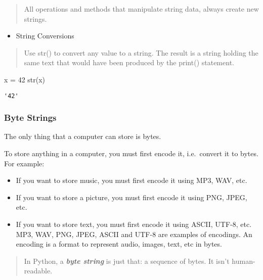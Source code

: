 \documentclass[
  letterpaper,
  DIV=11,
  numbers=noendperiod]{scrreprt}
\newenvironment{Shaded}{\begin{snugshade}}{\end{snugshade}}
\newcommand{\BuiltInTok}[1]{\textcolor[rgb]{0.00,0.46,0.62}{#1}}
\newcommand{\DecValTok}[1]{\textcolor[rgb]{0.68,0.00,0.00}{#1}}
\newcommand{\NormalTok}[1]{\textcolor[rgb]{0.00,0.46,0.62}{#1}}
\newcommand{\OperatorTok}[1]{\textcolor[rgb]{0.37,0.37,0.37}{#1}}
\providecommand{\tightlist}{%
  \setlength{\itemsep}{0pt}\setlength{\parskip}{0pt}}
\begin{document}
\begin{quote}
All operations and methods that manipulate string data, always create
new strings.
\end{quote}

\begin{itemize}
\tightlist
\item
  String Conversions
\end{itemize}

\begin{quote}
Use str() to convert any value to a string. The result is a string
holding the same text that would have been produced by the print()
statement.
\end{quote}

\begin{Shaded}
\begin{Highlighting}[]
\NormalTok{x }\OperatorTok{=} \DecValTok{42}
\BuiltInTok{str}\NormalTok{(x)}
\end{Highlighting}
\end{Shaded}

\begin{verbatim}
'42'
\end{verbatim}

\hypertarget{byte-strings}{%
\subsubsection{Byte Strings}\label{byte-strings}}

The only thing that a computer can store is bytes.

To store anything in a computer, you must first encode it, i.e.~convert
it to bytes. For example:

\begin{itemize}
\item
  If you want to store music, you must first encode it using MP3, WAV,
  etc.
\item
  If you want to store a picture, you must first encode it using PNG,
  JPEG, etc.
\item
  If you want to store text, you must first encode it using ASCII,
  UTF-8, etc. MP3, WAV, PNG, JPEG, ASCII and UTF-8 are examples of
  encodings. An encoding is a format to represent audio, images, text,
  etc in bytes.
\end{itemize}

\begin{quote}
In Python, a \emph{\textbf{byte string}} is just that: a sequence of
bytes. It isn't human-readable.
\end{quote}
\end{document}
